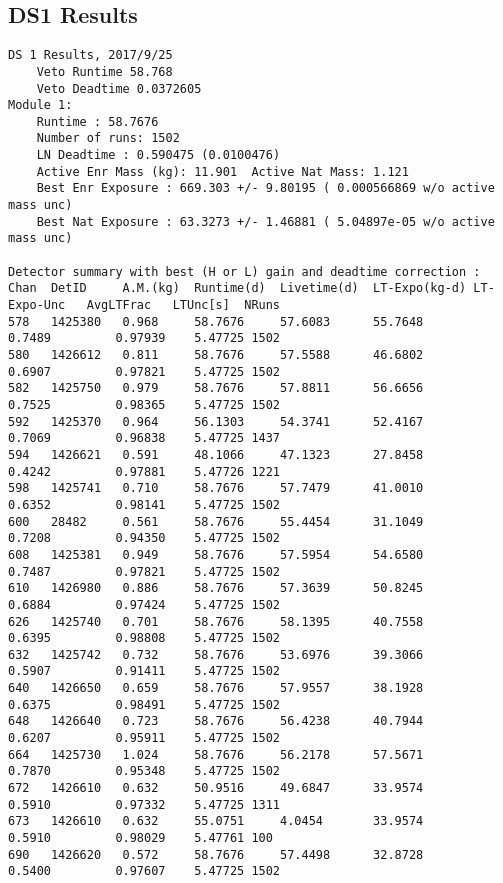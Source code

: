 \documentclass[notitlepage,rmp,aps,10pt]{revtex4-1}
\begin{document}
\subsection{DS1 Results}
\begin{verbatim}
DS 1 Results, 2017/9/25
	Veto Runtime 58.768
	Veto Deadtime 0.0372605
Module 1:
	Runtime : 58.7676
	Number of runs: 1502
	LN Deadtime : 0.590475 (0.0100476)
	Active Enr Mass (kg): 11.901  Active Nat Mass: 1.121
	Best Enr Exposure : 669.303 +/- 9.80195 ( 0.000566869 w/o active mass unc)
	Best Nat Exposure : 63.3273 +/- 1.46881 ( 5.04897e-05 w/o active mass unc)

Detector summary with best (H or L) gain and deadtime correction :
Chan  DetID     A.M.(kg)  Runtime(d)  Livetime(d)  LT-Expo(kg-d) LT-Expo-Unc   AvgLTFrac   LTUnc[s]  NRuns
578   1425380   0.968     58.7676     57.6083      55.7648        0.7489         0.97939    5.47725 1502
580   1426612   0.811     58.7676     57.5588      46.6802        0.6907         0.97821    5.47725 1502
582   1425750   0.979     58.7676     57.8811      56.6656        0.7525         0.98365    5.47725 1502
592   1425370   0.964     56.1303     54.3741      52.4167        0.7069         0.96838    5.47725 1437
594   1426621   0.591     48.1066     47.1323      27.8458        0.4242         0.97881    5.47726 1221
598   1425741   0.710     58.7676     57.7479      41.0010        0.6352         0.98141    5.47725 1502
600   28482     0.561     58.7676     55.4454      31.1049        0.7208         0.94350    5.47725 1502
608   1425381   0.949     58.7676     57.5954      54.6580        0.7487         0.97821    5.47725 1502
610   1426980   0.886     58.7676     57.3639      50.8245        0.6884         0.97424    5.47725 1502
626   1425740   0.701     58.7676     58.1395      40.7558        0.6395         0.98808    5.47725 1502
632   1425742   0.732     58.7676     53.6976      39.3066        0.5907         0.91411    5.47725 1502
640   1426650   0.659     58.7676     57.9557      38.1928        0.6375         0.98491    5.47725 1502
648   1426640   0.723     58.7676     56.4238      40.7944        0.6207         0.95911    5.47725 1502
664   1425730   1.024     58.7676     56.2178      57.5671        0.7870         0.95348    5.47725 1502
672   1426610   0.632     50.9516     49.6847      33.9574        0.5910         0.97332    5.47725 1311
673   1426610   0.632     55.0751     4.0454       33.9574        0.5910         0.98029    5.47761 100
690   1426620   0.572     58.7676     57.4498      32.8728        0.5400         0.97607    5.47725 1502

\end{verbatim}
\end{document}
